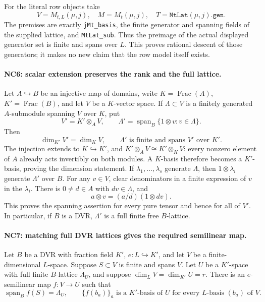 For the literal row objects take
\[
 V=M_{t,L}(\mu,j),\quad M=M_t(\mu,j),\quad
 T=\texttt{MtLat}(\mu,j).\texttt{gen}.
 \tag{NC.9}
\]
The premises are exactly \texttt{jMt\_basis}, the finite
generator and spanning fields of the supplied lattice, and
\texttt{MtLat\_sub}. Thus the preimage of the actual displayed
generator set is finite and spans over \(L\).
This proves rational descent of those generators; it makes
no new claim that the row model itself exists.

\paragraph{NC6: scalar extension preserves the rank and the full lattice.}
Let \(A\hookrightarrow B\) be an injective map of domains,
write \(K=\operatorname{Frac}(A)\), \(K'=\operatorname{Frac}(B)\),
and let \(V\) be a \(K\)-vector space.
If \(\Lambda\subset V\) is a finitely generated \(A\)-submodule
spanning \(V\) over \(K\), put
\[
 V'=K'\otimes_A V,\qquad
 \Lambda'=\operatorname{span}_B\{1\otimes v:v\in\Lambda\}.
 \tag{NC.10}
\]
Then
\[
 \dim_{K'}V'=\dim_K V,\qquad
 \Lambda'\text{ is finite and spans }V'\text{ over }K'.
 \tag{NC.11}
\]
The injection extends to \(K\hookrightarrow K'\), and
\(K'\otimes_A V\cong K'\otimes_K V\): every nonzero element
of \(A\) already acts invertibly on both modules.
A \(K\)-basis therefore becomes a \(K'\)-basis, proving the
dimension statement. If \(\lambda_1,\ldots,\lambda_s\)
generate \(\Lambda\), then \(1\otimes\lambda_i\) generate
\(\Lambda'\) over \(B\).
For any \(v\in V\), clear denominators in a finite expression
of \(v\) in the \(\lambda_i\). There is \(0\ne d\in A\)
with \(dv\in\Lambda\), and
\[
 a\otimes v=(a/d)(1\otimes dv).
 \tag{NC.12}
\]
This proves the spanning assertion for every pure tensor
and hence for all of \(V'\).
In particular, if \(B\) is a DVR, \(\Lambda'\) is a full
finite free \(B\)-lattice.

\paragraph{NC7: matching full DVR lattices gives the required semilinear map.}
Let \(B\) be a DVR with fraction field \(K'\),
\(e:L\hookrightarrow K'\), and let \(V\) be a finite-dimensional
\(L\)-space. Suppose \(S\subset V\) is finite and spans \(V\).
Let \(U\) be a \(K'\)-space with full finite \(B\)-lattice
\(\Lambda_U\), and suppose
\(\dim_LV=\dim_{K'}U=r\).
There is an \(e\)-semilinear map \(f:V\to U\) such that
\[
 \operatorname{span}_B f(S)=\Lambda_U,
 \qquad
 \{f(b_a)\}_a\text{ is a }K'\text{-basis of }U
 \text{ for every }L\text{-basis }(b_a)\text{ of }V.
 \tag{NC.13}
\]

